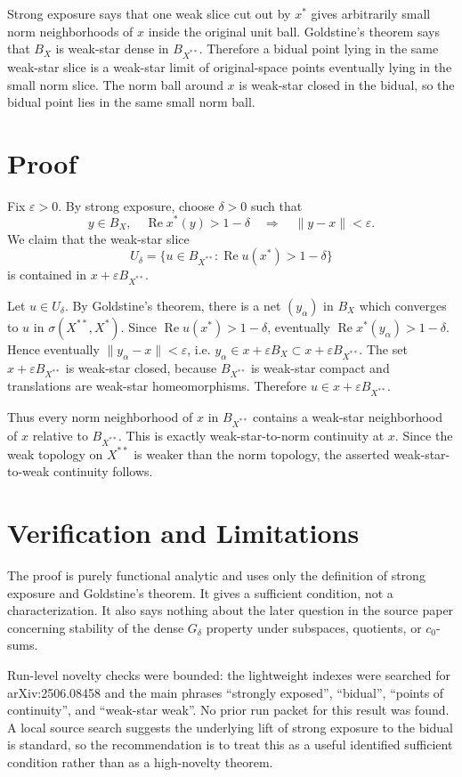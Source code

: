 \documentclass[11pt]{article}
\newcommand{\eps}{\varepsilon}
\begin{document}
Strong exposure says that one weak slice cut out by $x^*$ gives arbitrarily small
norm neighborhoods of $x$ inside the original unit ball. Goldstine's theorem says that
$B_X$ is weak-star dense in $B_{X^{**}}$. Therefore a bidual point lying in the same
weak-star slice is a weak-star limit of original-space points eventually lying in the
small norm slice. The norm ball around $x$ is weak-star closed in the bidual, so the
bidual point lies in the same small norm ball.

\section*{Proof}

Fix $\eps>0$. By strong exposure, choose $\delta>0$ such that
\[
 y\in B_X,\quad \operatorname{Re}x^*(y)>1-\delta
 \quad\Longrightarrow\quad
 \|y-x\|<\eps .
\]
We claim that the weak-star slice
\[
 U_\delta=\{u\in B_{X^{**}}:\operatorname{Re}u(x^*)>1-\delta\}
\]
is contained in $x+\eps B_{X^{**}}$.

Let $u\in U_\delta$. By Goldstine's theorem, there is a net $(y_\alpha)$ in $B_X$
which converges to $u$ in $\sigma(X^{**},X^*)$. Since
$\operatorname{Re}u(x^*)>1-\delta$, eventually
$\operatorname{Re}x^*(y_\alpha)>1-\delta$. Hence eventually
$\|y_\alpha-x\|<\eps$, i.e. $y_\alpha\in x+\eps B_X\subset x+\eps B_{X^{**}}$.
The set $x+\eps B_{X^{**}}$ is weak-star closed, because $B_{X^{**}}$ is weak-star
compact and translations are weak-star homeomorphisms. Therefore
$u\in x+\eps B_{X^{**}}$.

Thus every norm neighborhood of $x$ in $B_{X^{**}}$ contains a weak-star neighborhood
of $x$ relative to $B_{X^{**}}$. This is exactly weak-star-to-norm continuity at $x$.
Since the weak topology on $X^{**}$ is weaker than the norm topology, the asserted
weak-star-to-weak continuity follows.

\section*{Verification and Limitations}

The proof is purely functional analytic and uses only the definition of strong exposure
and Goldstine's theorem. It gives a sufficient condition, not a characterization. It
also says nothing about the later question in the source paper concerning stability of
the dense $G_\delta$ property under subspaces, quotients, or $c_0$-sums.

Run-level novelty checks were bounded: the lightweight indexes were searched for
arXiv:2506.08458 and the main phrases ``strongly exposed'', ``bidual'', ``points of
continuity'', and ``weak-star weak''. No prior run packet for this result was found.
A local source search suggests the underlying lift of strong exposure to the bidual is
standard, so the recommendation is to treat this as a useful identified sufficient
condition rather than as a high-novelty theorem.
\end{document}

